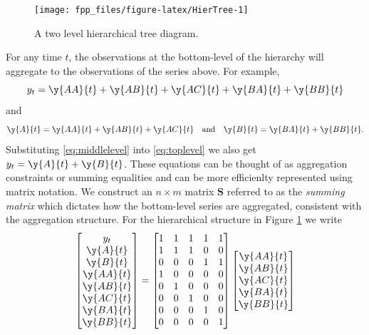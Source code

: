 \documentclass[]{book}
\begin{document}
\begin{figure}

{\centering \texttt{[image: fpp\_files/figure-latex/HierTree-1]} 

}

\caption{A two level hierarchical tree diagram.}\label{fig:HierTree}
\end{figure}

For any time \(t\), the observations at the bottom-level of the hierarchy will aggregate to the observations of the series above. For example,
\begin{equation}
y_{t}=\y{AA}{t}+\y{AB}{t}+\y{AC}{t}+\y{BA}{t}+\y{BB}{t}
  \label{eq:toplevel}
\end{equation} and
\begin{equation} \y{A}{t}=\y{AA}{t}+\y{AB}{t}+\y{AC}{t}\quad \text{and} \quad  \y{B}{t}=\y{BA}{t}+\y{BB}{t}.
\label{eq:middlelevel}
\end{equation}
Substituting \eqref{eq:middlelevel} into \eqref{eq:toplevel} we also get \(y_{t}=\y{A}{t}+\y{B}{t}\). These equations can be thought of as aggregation constraints or summing equalities and can be more efficienlty represented using matrix notation. We construct an \(n\times m\) matrix \(\bm{S}\) referred to as the \emph{summing matrix} which dictates how the bottom-level series are aggregated, consistent with the aggregation structure. For the hierarchical structure in Figure \ref{fig:HierTree} we write
\[
  \begin{bmatrix}
    y_{t} \\
    \y{A}{t} \\
    \y{B}{t} \\
    \y{AA}{t} \\
    \y{AB}{t} \\
    \y{AC}{t} \\
    \y{BA}{t} \\
    \y{BB}{t}
  \end{bmatrix}
  =
  \begin{bmatrix}
    1 & 1 & 1 & 1 & 1 \\
    1 & 1 & 1 & 0 & 0 \\
    0 & 0 & 0 & 1 & 1 \\
    1  & 0  & 0  & 0  & 0  \\
    0  & 1  & 0  & 0  & 0  \\
    0  & 0  & 1  & 0  & 0  \\
    0  & 0  & 0  & 1  & 0  \\
    0  & 0  & 0  & 0  & 1
  \end{bmatrix}
  \begin{bmatrix}
    \y{AA}{t} \\
    \y{AB}{t} \\
    \y{AC}{t} \\
    \y{BA}{t} \\
    \y{BB}{t}
  \end{bmatrix}
\]
\end{document}
